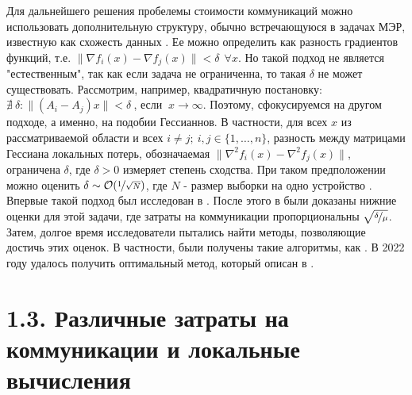 \documentclass{article}
\theoremstyle{definition}
\theoremstyle{plain}
\begin{document}
Для дальнейшего решения пробелемы стоимости коммуникаций можно использовать дополнительную структуру, обычно встречающуюся в задачах МЭР, известную как схожесть данных \cite{arjevani2015communication, shamir2014communication, matsushima2014distributed}. Ее можно определить как разность градиентов функций, т.е. $\|\nabla f_i (x) - \nabla f_j (x)\| < \delta ~~ \forall x$. Но такой подход не является "естественным", так как если задача не ограниченна, то такая $\delta$ не может существовать. Рассмотрим, например, квадратичную постановку: $\nexists~ \delta: \|(A_i - A_j)x\| < \delta~$, если $~ x\rightarrow \infty$. Поэтому, сфокусируемся на другом подходе, а именно, на подобии Гессианнов. В частности, для всех $x$ из рассматриваемой области и всех $i \neq j; ~ i,j \in \{1,\ldots,n\}$, разность между матрицами Гессиана локальных потерь, обозначаемая $\|\nabla ^2 f_i(x) - \nabla ^2 f_j(x)\|$, ограничена $\delta$, где $\delta > 0$ измеряет степень сходства. При таком предположении можно оценить $\delta \sim \mathcal O(\nicefrac{1}{\sqrt{N}})$, где $N$ - размер выборки на одно устройство \cite{arjevani2015communication}. Впервые такой подход был исследован в \cite{shamir2014communication}. После этого в \cite{arjevani2015communication} были доказаны нижние оценки для этой задачи, где затраты на коммуникации пропорциональны $\sqrt{\nicefrac{\delta}{\mu}}$. Затем, долгое время исследователи пытались найти методы, позволяющие достичь этих оценок. В частности, были получены такие алгоритмы, как \cite{tian2022acceleration, sun2022distributed, reddi2016aide, hendrikx2020statistically, beznosikov2021distributed}. В 2022 году удалось получить оптимальный метод, который описан в \cite{kovalev2022optimal}. 

\section*{1.3. Различные затраты на коммуникации и локальные вычисления} \label{eq:1.3}
\end{document}
